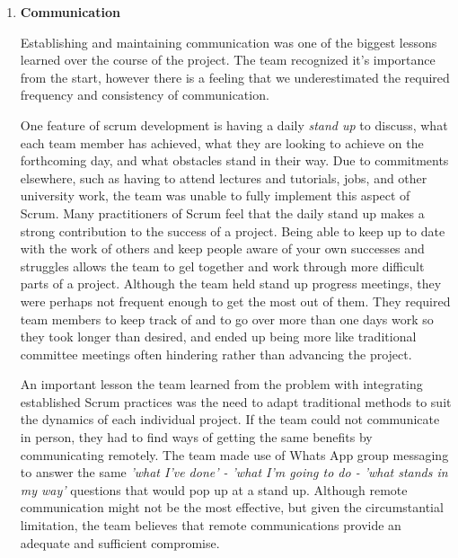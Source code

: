 \documentclass[11pt]{article}
\begin{document}
{\begin{enumerate}
	
	\item \textbf{Communication}
	
	Establishing and maintaining communication was one of the biggest lessons learned over the course of the project. The team recognized it's importance from the start, however there is a feeling that we underestimated the required frequency and consistency of communication.
	
	One feature of scrum development is having a daily \textit{stand up} to discuss, what each team member has achieved, what they are looking to achieve on the forthcoming day, and what obstacles stand in their way. Due to commitments elsewhere, such as having to attend lectures and tutorials, jobs, and other university work, the team was unable to fully implement this aspect of Scrum. Many practitioners of Scrum feel that the daily stand up makes a strong contribution to the success of a project. Being able to keep up to date with the work of others and keep people aware of your own successes and struggles allows the team to gel together and work through more difficult parts of a project. Although the team held stand up progress meetings, they were perhaps not frequent enough to get the most out of them. They required team members to keep track of and to go over more than one days work so they took longer than desired, and ended up being more like traditional committee meetings often hindering rather than advancing the project.
	
	An important lesson the team learned from the problem with integrating established Scrum practices was the need to adapt traditional methods to suit the dynamics of each individual project. If the team could not communicate in person, they had to find ways of getting the same benefits by communicating remotely. The team made use of Whats App group messaging to answer the same \textit{'what I've done' - 'what I'm going to do - 'what stands in my way'} questions that would pop up at a stand up. Although remote communication might not be the most effective, but given the circumstantial limitation, the team believes that remote communications provide an adequate and sufficient compromise. 
	


\end{enumerate}}
\end{document}
